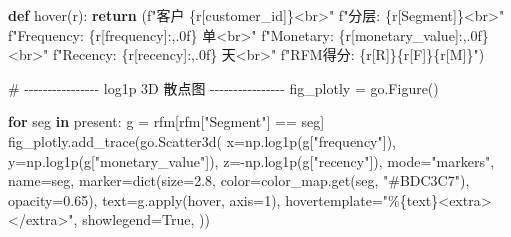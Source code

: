 \documentclass[
]{ctexart}
\newenvironment{Shaded}{\begin{snugshade}}{\end{snugshade}}
\newcommand{\BuiltInTok}[1]{\textcolor[rgb]{0.00,0.23,0.31}{#1}}
\newcommand{\CommentTok}[1]{\textcolor[rgb]{0.37,0.37,0.37}{#1}}
\newcommand{\ControlFlowTok}[1]{\textcolor[rgb]{0.00,0.23,0.31}{\textbf{#1}}}
\newcommand{\DecValTok}[1]{\textcolor[rgb]{0.68,0.00,0.00}{#1}}
\newcommand{\FloatTok}[1]{\textcolor[rgb]{0.68,0.00,0.00}{#1}}
\newcommand{\KeywordTok}[1]{\textcolor[rgb]{0.00,0.23,0.31}{\textbf{#1}}}
\newcommand{\NormalTok}[1]{\textcolor[rgb]{0.00,0.23,0.31}{#1}}
\newcommand{\OperatorTok}[1]{\textcolor[rgb]{0.37,0.37,0.37}{#1}}
\newcommand{\SpecialCharTok}[1]{\textcolor[rgb]{0.37,0.37,0.37}{#1}}
\newcommand{\SpecialStringTok}[1]{\textcolor[rgb]{0.13,0.47,0.30}{#1}}
\newcommand{\StringTok}[1]{\textcolor[rgb]{0.13,0.47,0.30}{#1}}
\newcommand{\VariableTok}[1]{\textcolor[rgb]{0.07,0.07,0.07}{#1}}
\begin{document}
\begin{Shaded}
\begin{Highlighting}[]
\KeywordTok{def}\NormalTok{ hover(r):}
    \ControlFlowTok{return}\NormalTok{ (}\SpecialStringTok{f"客户 }\SpecialCharTok{\{}\NormalTok{r[}\StringTok{\textquotesingle{}customer\_id\textquotesingle{}}\NormalTok{]}\SpecialCharTok{\}}\SpecialStringTok{\textless{}br\textgreater{}"}
            \SpecialStringTok{f"分层: }\SpecialCharTok{\{}\NormalTok{r[}\StringTok{\textquotesingle{}Segment\textquotesingle{}}\NormalTok{]}\SpecialCharTok{\}}\SpecialStringTok{\textless{}br\textgreater{}"}
            \SpecialStringTok{f"Frequency: }\SpecialCharTok{\{}\NormalTok{r[}\StringTok{\textquotesingle{}frequency\textquotesingle{}}\NormalTok{]}\SpecialCharTok{:,.0f\}}\SpecialStringTok{ 单\textless{}br\textgreater{}"}
            \SpecialStringTok{f"Monetary: }\SpecialCharTok{\{}\NormalTok{r[}\StringTok{\textquotesingle{}monetary\_value\textquotesingle{}}\NormalTok{]}\SpecialCharTok{:,.0f\}}\SpecialStringTok{\textless{}br\textgreater{}"}
            \SpecialStringTok{f"Recency: }\SpecialCharTok{\{}\NormalTok{r[}\StringTok{\textquotesingle{}recency\textquotesingle{}}\NormalTok{]}\SpecialCharTok{:,.0f\}}\SpecialStringTok{ 天\textless{}br\textgreater{}"}
            \SpecialStringTok{f"RFM得分: }\SpecialCharTok{\{}\NormalTok{r[}\StringTok{\textquotesingle{}R\textquotesingle{}}\NormalTok{]}\SpecialCharTok{\}\{}\NormalTok{r[}\StringTok{\textquotesingle{}F\textquotesingle{}}\NormalTok{]}\SpecialCharTok{\}\{}\NormalTok{r[}\StringTok{\textquotesingle{}M\textquotesingle{}}\NormalTok{]}\SpecialCharTok{\}}\SpecialStringTok{"}\NormalTok{)}

\CommentTok{\# {-}{-}{-}{-}{-}{-}{-}{-}{-}{-}{-}{-}{-}{-}{-}{-} log1p 3D 散点图 {-}{-}{-}{-}{-}{-}{-}{-}{-}{-}{-}{-}{-}{-}{-}{-}}
\NormalTok{fig\_plotly }\OperatorTok{=}\NormalTok{ go.Figure()}

\ControlFlowTok{for}\NormalTok{ seg }\KeywordTok{in}\NormalTok{ present:}
\NormalTok{    g }\OperatorTok{=}\NormalTok{ rfm[rfm[}\StringTok{"Segment"}\NormalTok{] }\OperatorTok{==}\NormalTok{ seg]}
\NormalTok{    fig\_plotly.add\_trace(go.Scatter3d(}
\NormalTok{        x}\OperatorTok{=}\NormalTok{np.log1p(g[}\StringTok{"frequency"}\NormalTok{]), }
\NormalTok{        y}\OperatorTok{=}\NormalTok{np.log1p(g[}\StringTok{"monetary\_value"}\NormalTok{]), }
\NormalTok{        z}\OperatorTok{={-}}\NormalTok{np.log1p(g[}\StringTok{"recency"}\NormalTok{]),}
\NormalTok{        mode}\OperatorTok{=}\StringTok{"markers"}\NormalTok{, }
\NormalTok{        name}\OperatorTok{=}\NormalTok{seg, }
\NormalTok{        marker}\OperatorTok{=}\BuiltInTok{dict}\NormalTok{(size}\OperatorTok{=}\FloatTok{2.8}\NormalTok{, color}\OperatorTok{=}\NormalTok{color\_map.get(seg, }\StringTok{"\#BDC3C7"}\NormalTok{), opacity}\OperatorTok{=}\FloatTok{0.65}\NormalTok{),}
\NormalTok{        text}\OperatorTok{=}\NormalTok{g.}\BuiltInTok{apply}\NormalTok{(hover, axis}\OperatorTok{=}\DecValTok{1}\NormalTok{), }
\NormalTok{        hovertemplate}\OperatorTok{=}\StringTok{"\%}\SpecialCharTok{\{text\}}\StringTok{\textless{}extra\textgreater{}\textless{}/extra\textgreater{}"}\NormalTok{,}
\NormalTok{        showlegend}\OperatorTok{=}\VariableTok{True}\NormalTok{,}
\NormalTok{    ))}


\end{Highlighting}
\end{Shaded}
\end{document}

